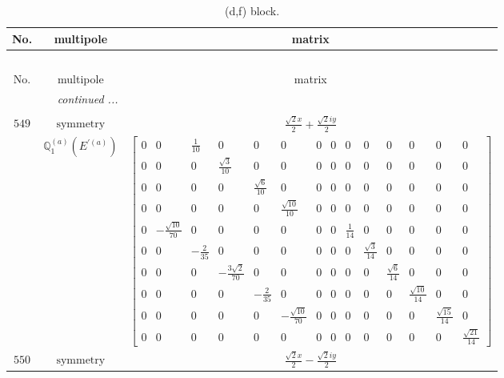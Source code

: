 \documentclass[fleqn,8pt,landscape]{jsarticle}
\begin{document}
\begin{longtable}{ccc}
\caption{(d,f) block.}
 \\
 \hline \hline
No. & multipole & matrix \\ \hline \endfirsthead

\multicolumn{2}{l}{\tablename\ \thetable{}} \\
 \hline \hline
No. & multipole & matrix \\ \hline \endhead

 \hline \hline
\multicolumn{2}{r}{\footnotesize\it continued ...} \\ \endfoot

 \hline \hline
\multicolumn{2}{r}{} \\ \endlastfoot

$ 549 $ & $ \text{symmetry} $ & $ \frac{\sqrt{2} x}{2} + \frac{\sqrt{2} i y}{2} $ \\
$  $ & $ \mathbb{Q}_{1}^{(a)}(E^{\prime(a)}) $ & $ \begin{bmatrix} 0 & 0 & \frac{1}{10} & 0 & 0 & 0 & 0 & 0 & 0 & 0 & 0 & 0 & 0 & 0 \\ 0 & 0 & 0 & \frac{\sqrt{3}}{10} & 0 & 0 & 0 & 0 & 0 & 0 & 0 & 0 & 0 & 0 \\ 0 & 0 & 0 & 0 & \frac{\sqrt{6}}{10} & 0 & 0 & 0 & 0 & 0 & 0 & 0 & 0 & 0 \\ 0 & 0 & 0 & 0 & 0 & \frac{\sqrt{10}}{10} & 0 & 0 & 0 & 0 & 0 & 0 & 0 & 0 \\ 0 & - \frac{\sqrt{10}}{70} & 0 & 0 & 0 & 0 & 0 & 0 & \frac{1}{14} & 0 & 0 & 0 & 0 & 0 \\ 0 & 0 & - \frac{2}{35} & 0 & 0 & 0 & 0 & 0 & 0 & \frac{\sqrt{3}}{14} & 0 & 0 & 0 & 0 \\ 0 & 0 & 0 & - \frac{3 \sqrt{2}}{70} & 0 & 0 & 0 & 0 & 0 & 0 & \frac{\sqrt{6}}{14} & 0 & 0 & 0 \\ 0 & 0 & 0 & 0 & - \frac{2}{35} & 0 & 0 & 0 & 0 & 0 & 0 & \frac{\sqrt{10}}{14} & 0 & 0 \\ 0 & 0 & 0 & 0 & 0 & - \frac{\sqrt{10}}{70} & 0 & 0 & 0 & 0 & 0 & 0 & \frac{\sqrt{15}}{14} & 0 \\ 0 & 0 & 0 & 0 & 0 & 0 & 0 & 0 & 0 & 0 & 0 & 0 & 0 & \frac{\sqrt{21}}{14} \end{bmatrix} $ \\ \hline
$ 550 $ & $ \text{symmetry} $ & $ \frac{\sqrt{2} x}{2} - \frac{\sqrt{2} i y}{2} $ \\

\end{longtable}
\end{document}
